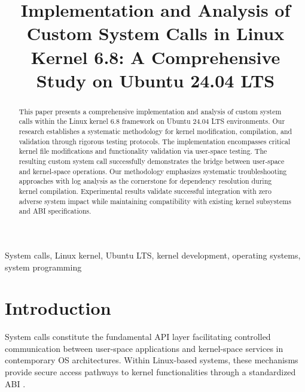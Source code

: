 \documentclass[conference]{IEEEtran}
\begin{document}
\title{Implementation and Analysis of Custom System Calls in Linux Kernel 6.8: A Comprehensive Study on Ubuntu 24.04 LTS}

\author{
\and
{}
}

\maketitle

\begin{abstract}
This paper presents a comprehensive implementation and analysis of custom system calls within the Linux kernel 6.8 framework on Ubuntu 24.04 \gls{LTS} environments. Our research establishes a systematic methodology for kernel modification, compilation, and validation through rigorous testing protocols. The implementation encompasses critical kernel file modifications and functionality validation via user-space testing. The resulting custom system call successfully demonstrates the bridge between user-space and kernel-space operations. Our methodology emphasizes systematic troubleshooting approaches with log analysis as the cornerstone for dependency resolution during kernel compilation. Experimental results validate successful integration with zero adverse system impact while maintaining compatibility with existing kernel subsystems and \gls{ABI} specifications.
\end{abstract}

\begin{IEEEkeywords}
System calls, Linux kernel, Ubuntu LTS, kernel development, operating systems, system programming
\end{IEEEkeywords}

\section{Introduction}

System calls constitute the fundamental \gls{API} layer facilitating controlled communication between user-space applications and kernel-space services in contemporary \gls{OS} architectures. Within Linux-based systems, these mechanisms provide secure access pathways to kernel functionalities through a standardized \gls{ABI} \cite{silberschatz2018}.
\end{document}
